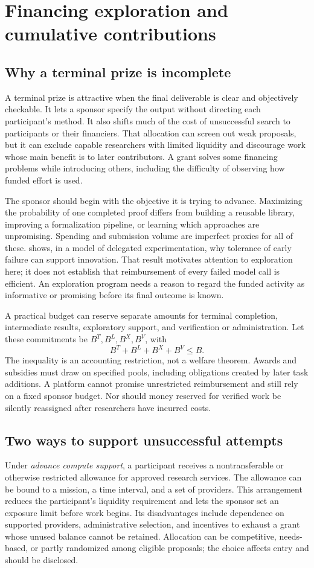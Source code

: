 \documentclass[11pt,a4paper]{article}
\begin{document}
\section{Financing exploration and cumulative contributions}
\label{sec:funding}
\subsection{Why a terminal prize is incomplete}
A terminal prize is attractive when the final deliverable is clear and objectively checkable. It lets a sponsor specify the output without directing each participant's method. It also shifts much of the cost of unsuccessful search to participants or their financiers. That allocation can screen out weak proposals, but it can exclude capable researchers with limited liquidity and discourage work whose main benefit is to later contributors. A grant solves some financing problems while introducing others, including the difficulty of observing how funded effort is used.

The sponsor should begin with the objective it is trying to advance. Maximizing the probability of one completed proof differs from building a reusable library, improving a formalization pipeline, or learning which approaches are unpromising. Spending and submission volume are imperfect proxies for all of these. \citet{manso} shows, in a model of delegated experimentation, why tolerance of early failure can support innovation. That result motivates attention to exploration here; it does not establish that reimbursement of every failed model call is efficient. An exploration program needs a reason to regard the funded activity as informative or promising before its final outcome is known.

A practical budget can reserve separate amounts for terminal completion, intermediate results, exploratory support, and verification or administration. Let these commitments be $B^T,B^L,B^X,B^V$, with
\[
 B^T+B^L+B^X+B^V\leq B.
\]
The inequality is an accounting restriction, not a welfare theorem. Awards and subsidies must draw on specified pools, including obligations created by later task additions. A platform cannot promise unrestricted reimbursement and still rely on a fixed sponsor budget. Nor should money reserved for verified work be silently reassigned after researchers have incurred costs.

\subsection{Two ways to support unsuccessful attempts}
Under \emph{advance compute support}, a participant receives a nontransferable or otherwise restricted allowance for approved research services. The allowance can be bound to a mission, a time interval, and a set of providers. This arrangement reduces the participant's liquidity requirement and lets the sponsor set an exposure limit before work begins. Its disadvantages include dependence on supported providers, administrative selection, and incentives to exhaust a grant whose unused balance cannot be retained. Allocation can be competitive, needs-based, or partly randomized among eligible proposals; the choice affects entry and should be disclosed.
\end{document}
